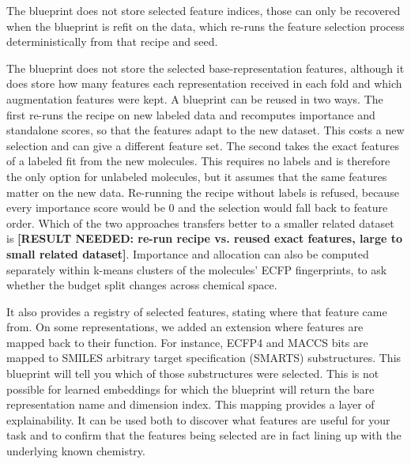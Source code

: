 The blueprint does not store selected feature indices, those can only be recovered when the blueprint is refit on the data, which re-runs the feature selection process deterministically from that recipe and seed.

The blueprint does not store the selected base-representation features, although it does store how many features each representation received in each fold and which augmentation features were kept. A blueprint can be reused in two ways. The first re-runs the recipe on new labeled data and recomputes importance and standalone scores, so that the features adapt to the new dataset. This costs a new selection and can give a different feature set. The second takes the exact features of a labeled fit from the new molecules. This requires no labels and is therefore the only option for unlabeled molecules, but it assumes that the same features matter on the new data. Re-running the recipe without labels is refused, because every importance score would be 0 and the selection would fall back to feature order. Which of the two approaches transfers better to a smaller related dataset is \textbf{[RESULT NEEDED: re-run recipe vs. reused exact features, large to small related dataset]}. Importance and allocation can also be computed separately within k-means clusters of the molecules' ECFP fingerprints, to ask whether the budget split changes across chemical space.

It also provides a registry of selected features, stating where that feature came from. On some representations, we added an extension where features are mapped back to their function. For instance, ECFP4 and MACCS bits are mapped to SMILES arbitrary target specification (SMARTS) substructures. This blueprint will tell you which of those substructures were selected. This is not possible for learned embeddings for which the blueprint will return the bare representation name and dimension index. This mapping provides a layer of explainability. It can be used both to discover what features are useful for your task and to confirm that the features being selected are in fact lining up with the underlying known chemistry.

